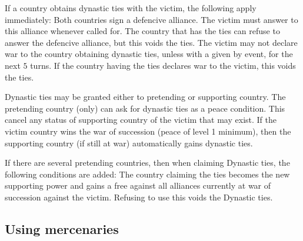  If a country obtains dynastic ties with the victim, the
following apply immediately:
\bparag Both countries sign a defencive alliance. The victim must answer to
this alliance whenever called for. The country that has the ties can refuse to
answer the defencive alliance, but this voids the ties.
\bparag The victim may not declare war to the country obtaining dynastic ties,
unless with a \CB given by event, for the next $5$ turns.
\bparag If the country having the ties declares war to the victim, this voids
the ties.

 Dynastic ties may be granted either to
pretending or supporting country.
\bparag The pretending country (only) can ask for dynastic ties as a peace
condition. This cancel any status of supporting country of the victim that may
exist.
\bparag If the victim country wins the war of succession (peace of level 1
minimum), then the supporting country (if still at war) automatically gains
dynastic ties.

 If there are several pretending
countries, then when claiming Dynastic ties, the following conditions are
added:
\bparag The country claiming the ties becomes the new supporting power and
gains a free \CB against all alliances currently at war of succession against
the victim.
\bparag Refusing to use this \CB voids the Dynastic ties.



\subsection{Using mercenaries}\label{chSpecific:Mercenaries}

